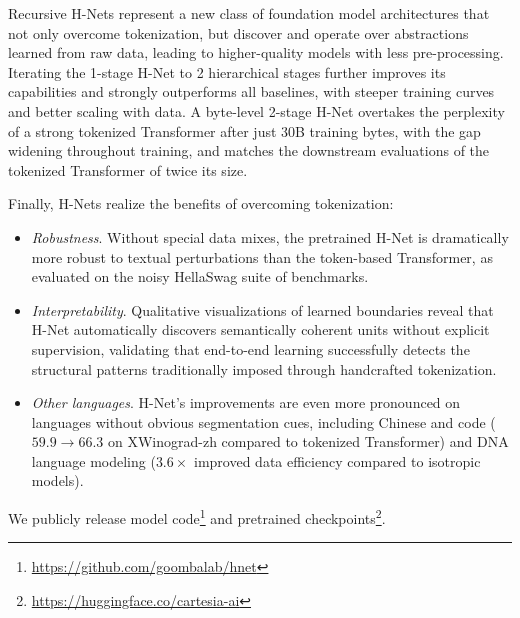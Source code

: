 Recursive H-Nets represent a new class of foundation model architectures that not only overcome tokenization, but discover and operate over abstractions learned from raw data, leading to higher-quality models with less pre-processing.
Iterating the 1-stage H-Net to 2 hierarchical stages further improves its capabilities and strongly outperforms all baselines, with steeper training curves and better scaling with data.
A byte-level 2-stage H-Net overtakes the perplexity of a strong tokenized Transformer after just 30B training bytes, with the gap widening throughout training, and matches the downstream evaluations of the tokenized Transformer of twice its size.

Finally, H-Nets realize the benefits of overcoming tokenization:
\begin{itemize}
    \item \textit{Robustness}.
    Without special data mixes, the pretrained H-Net is dramatically more robust to textual perturbations than the token-based Transformer, as evaluated on the noisy HellaSwag suite of benchmarks.
    \item \textit{Interpretability}.
    Qualitative visualizations of learned boundaries reveal that H-Net automatically discovers semantically coherent units without explicit supervision, validating that end-to-end learning successfully detects the structural patterns traditionally imposed through handcrafted tokenization.
    \item \textit{Other languages}.
    H-Net's improvements are even more pronounced on languages without obvious segmentation cues, including Chinese and code ($59.9 \to 66.3$ on XWinograd-zh compared to tokenized Transformer) and DNA language modeling ($3.6\times$ improved data efficiency compared to isotropic models).
\end{itemize}

We publicly release model code\footnote{\url{https://github.com/goombalab/hnet}} and pretrained checkpoints\footnote{\url{https://huggingface.co/cartesia-ai}}. 


